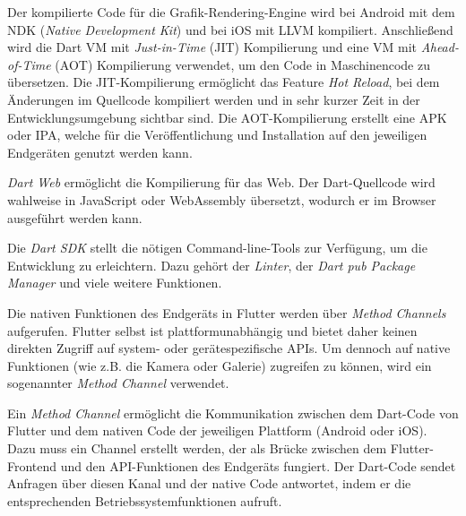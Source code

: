 \documentclass[a4paper,12pt]{article}
\begin{document}
\vspace{0.5cm}

Der kompilierte Code für die Grafik-Rendering-Engine wird bei Android mit dem NDK (\textit{Native Development Kit}) und bei iOS mit LLVM kompiliert. Anschließend wird die Dart VM mit \textit{Just-in-Time} (JIT) Kompilierung und eine VM mit \textit{Ahead-of-Time} (AOT) Kompilierung verwendet, um den Code in Maschinencode zu übersetzen. Die JIT-Kompilierung ermöglicht das Feature \textit{Hot Reload}, bei dem Änderungen im Quellcode kompiliert werden und in sehr kurzer Zeit in der Entwicklungsumgebung sichtbar sind. Die AOT-Kompilierung erstellt eine APK oder IPA, welche für die Veröffentlichung und Installation auf den jeweiligen Endgeräten genutzt werden kann.

\vspace{0.5cm}

\textit{Dart Web} ermöglicht die Kompilierung für das Web. Der Dart-Quellcode wird wahlweise in JavaScript oder WebAssembly übersetzt, wodurch er im Browser ausgeführt werden kann.

\vspace{0.5cm}

Die \textit{Dart SDK} stellt die nötigen Command-line-Tools zur Verfügung, um die Entwicklung zu erleichtern. Dazu gehört der \textit{Linter}, der \textit{Dart pub Package Manager} und viele weitere Funktionen.

\vspace{0.5cm}

Die nativen Funktionen des Endgeräts in Flutter werden über \textit{Method Channels} aufgerufen. Flutter selbst ist plattformunabhängig und bietet daher keinen direkten Zugriff auf system- oder gerätespezifische APIs. Um dennoch auf native Funktionen (wie z.B. die Kamera oder Galerie) zugreifen zu können, wird ein sogenannter \textit{Method Channel} verwendet.

\vspace{0.5cm}

Ein \textit{Method Channel} ermöglicht die Kommunikation zwischen dem Dart-Code von Flutter und dem nativen Code der jeweiligen Plattform (Android oder iOS). Dazu muss ein Channel erstellt werden, der als Brücke zwischen dem Flutter-Frontend und den API-Funktionen des Endgeräts fungiert. Der Dart-Code sendet Anfragen über diesen Kanal und der native Code antwortet, indem er die entsprechenden Betriebssystemfunktionen aufruft.

\vspace{0.5cm}
\end{document}
